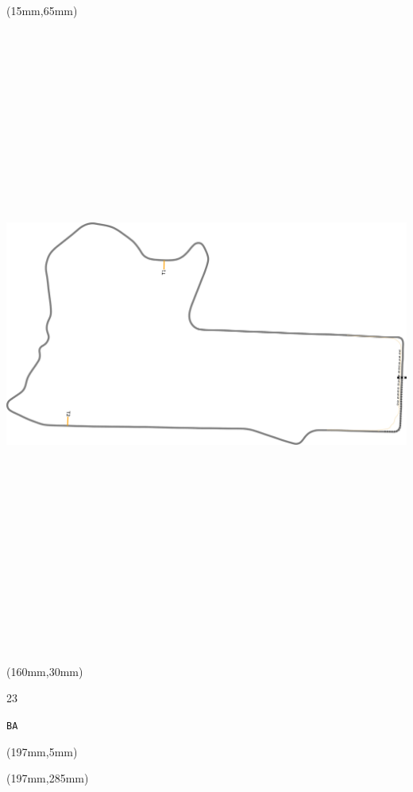 \begin{textblock*}{185mm}(15mm,65mm)%
\centering
\mbox{\includegraphics[width=185mm,height=210mm,keepaspectratio]{PT/BA.pdf}}
\end{textblock*}
\begin{textblock*}{40mm}(160mm,30mm)%
\Large
\par{} 
\par23 
\par\hfill\tiny\tt BA\\
\end{textblock*}
\begin{textblock*}{20mm}(197mm,5mm)%
\fbox{\thepage}
\label{BA}
\end{textblock*}
\begin{textblock*}{20mm}(197mm,285mm)%
\fbox{\thepage}
\end{textblock*}

